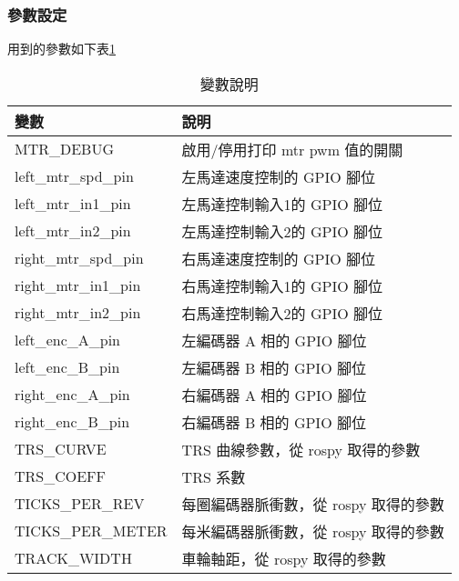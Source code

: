 \subsubsection{參數設定}
用到的參數如下表\ref{tab:variables}
\begin{table}[ht]
\centering
\caption{變數說明}
\label{tab:variables}
\begin{tabular}{|l|l|}
\hline
\textbf{變數}            & \textbf{說明}                                                \\ \hline
MTR\_DEBUG       & 啟用/停用打印 mtr pwm 值的開關                                \\ \hline
left\_mtr\_spd\_pin & 左馬達速度控制的 GPIO 腳位                                   \\ \hline
left\_mtr\_in1\_pin & 左馬達控制輸入1的 GPIO 腳位                                 \\ \hline
left\_mtr\_in2\_pin & 左馬達控制輸入2的 GPIO 腳位                                 \\ \hline
right\_mtr\_spd\_pin & 右馬達速度控制的 GPIO 腳位                                  \\ \hline
right\_mtr\_in1\_pin & 右馬達控制輸入1的 GPIO 腳位                                 \\ \hline
right\_mtr\_in2\_pin & 右馬達控制輸入2的 GPIO 腳位                                 \\ \hline
left\_enc\_A\_pin  & 左編碼器 A 相的 GPIO 腳位                                     \\ \hline
left\_enc\_B\_pin  & 左編碼器 B 相的 GPIO 腳位                                     \\ \hline
right\_enc\_A\_pin & 右編碼器 A 相的 GPIO 腳位                                     \\ \hline
right\_enc\_B\_pin & 右編碼器 B 相的 GPIO 腳位                                     \\ \hline
TRS\_CURVE       & TRS 曲線參數，從 rospy 取得的參數                             \\ \hline
TRS\_COEFF       & TRS 系數                                                      \\ \hline
TICKS\_PER\_REV  & 每圈編碼器脈衝數，從 rospy 取得的參數                         \\ \hline
TICKS\_PER\_METER & 每米編碼器脈衝數，從 rospy 取得的參數                         \\ \hline
TRACK\_WIDTH     & 車輪軸距，從 rospy 取得的參數                                 \\ \hline

\end{tabular}
\end{table}
